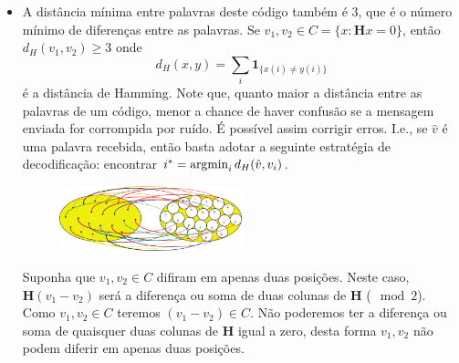 \begin{frame}[allowframebreaks]
\begin{itemize}
\begin{itemize}
	\end{itemize}
  \item A distância mínima entre palavras deste código também é 3, que é o número mínimo de diferenças entre as palavras.
  	Se $v_1, v_2 \in C = \{ x: \mathbf{H} x = 0 \}$, então $d_H (v_1, v_2) \geq 3$ onde
		\begin{equation}
		d_H(x,y) = \sum_i \mathbf{1}_{\{x(i) \neq y(i)\}}
		\end{equation}
	é a distância de Hamming. Note que, quanto maior a distância entre as palavras de um código, menor a chance
	de haver confusão se a mensagem enviada for corrompida por ruído. É possível assim corrigir erros. I.e.,
	se $\hat{v}$ é uma palavra recebida, então basta adotar a seguinte estratégia de decodificação:
	encontrar $i^\ast = \operatorname*{\arg\!\min}_i d_H(\hat{v},v_i)$.
                \begin{figure}[h!]
                \centering
                \includegraphics[width=0.5\textwidth]{images/binpack.pdf}
                \label{fig:binpack2}
                \end{figure}
  	Suponha que $v_1, v_2 \in C$ difiram em apenas duas posições. Neste caso, $\mathbf{H} (v_1 - v_2)$
	será a diferença ou soma de duas colunas de $\mathbf{H}$ ($\mod 2$). Como $v_1, v_2 \in C$ 
	teremos $(v_1 - v_2) \in C$. Não poderemos ter a diferença ou soma de quaisquer duas colunas de $\mathbf{H}$
	igual a zero, desta forma $v_1,v_2$ não podem diferir em apenas duas posições.
  \end{itemize}
\end{frame}
